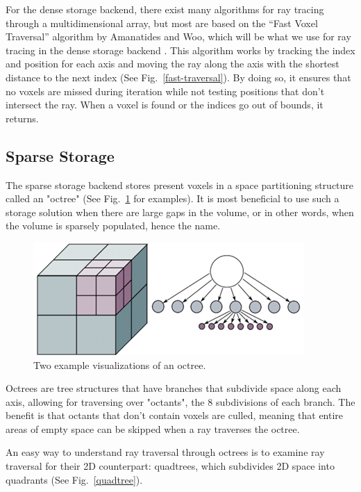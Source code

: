\documentclass[conference]{IEEEtran}
\begin{document}
For the dense storage backend, there exist many algorithms for ray tracing through a multidimensional array, but most are based on the “Fast Voxel Traversal” algorithm by Amanatides and Woo, which will be what we use for ray tracing in the dense storage backend \cite{amanatides}.
This algorithm works by tracking the index and position for each axis and moving the ray along the axis with the shortest distance to the next index (See Fig.~\ref{fast-traversal}).
By doing so, it ensures that no voxels are missed during iteration while not testing positions that don't intersect the ray.
When a voxel is found or the indices go out of bounds, it returns.

\subsection{Sparse Storage}

The sparse storage backend stores present voxels in a space partitioning structure called an "octree" (See Fig.~\ref{octree} for examples).
It is most beneficial to use such a storage solution when there are large gaps in the volume, or in other words, when the volume is sparsely populated, hence the name.

\begin{figure}[htbp]
\centerline{\includegraphics[width=\linewidth]{octree}}
\caption{Two example visualizations of an octree.}
\label{octree}
\end{figure}

Octrees are tree structures that have branches that subdivide space along each axis, allowing for traversing over "octants", the 8 subdivisions of each branch.
The benefit is that octants that don't contain voxels are culled, meaning that entire areas of empty space can be skipped when a ray traverses the octree.

An easy way to understand ray traversal through octrees is to examine ray traversal for their 2D counterpart: quadtrees, which subdivides 2D space into quadrants (See Fig.~\ref{quadtree}).
\end{document}

